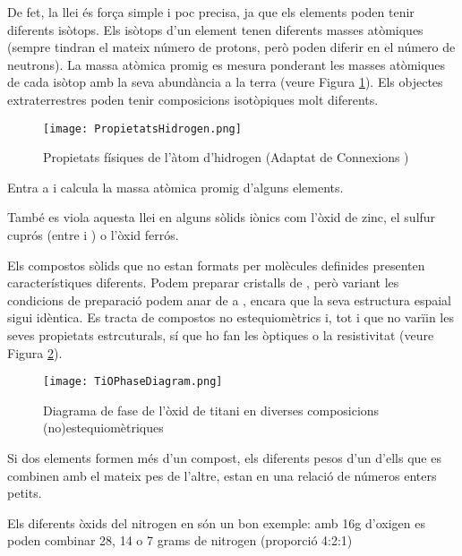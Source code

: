De fet, la llei és força simple i poc precisa, ja que els elements poden tenir diferents isòtops.
Els isòtops d'un element tenen diferents masses atòmiques (sempre tindran el mateix número de protons, però poden diferir en el número de neutrons). La massa atòmica promig es mesura ponderant les masses atòmiques de cada isòtop amb la seva abundància a la terra (veure Figura \ref{fig:PropietatsHidrogen}).
Els objectes extraterrestres poden tenir composicions isotòpiques molt diferents.
\begin{figure}[h]
\centering
\texttt{[image: PropietatsHidrogen.png]}
\caption{Propietats físiques de l'àtom d'hidrogen (Adaptat de Connexions )}
\label{fig:PropietatsHidrogen}
\end{figure}
\begin{exr}
Entra a  i calcula la massa atòmica promig d'alguns elements.
\end{exr}
També es viola aquesta llei en alguns sòlids iònics com l'òxid de zinc, el sulfur cuprós (entre  i ) o l'òxid ferrós.

Els compostos sòlids que no estan formats per molècules definides presenten característiques diferents. Podem preparar cristalls de , però variant les condicions de preparació podem anar de  a , encara que la seva estructura espaial sigui idèntica. Es tracta de compostos no estequiomètrics i, tot i que no varïin les seves propietats estrcuturals, sí que ho fan les òptiques o la resistivitat (veure Figura \ref{fig:TiOPhaseDiagram}).
\begin{figure}[h]
\centering
\texttt{[image: TiOPhaseDiagram.png]}
\caption{Diagrama de fase de l'òxid de titani en diverses composicions (no)estequiomètriques\cite{de_vries_phase_1954}}
\label{fig:TiOPhaseDiagram}
\end{figure}

\begin{mdframed}[backgroundcolor=gray!30,frametitle=Llei de les proporcions múltiples]
Si dos elements formen més d'un compost, els diferents pesos d'un d'ells que es combinen amb el mateix pes de l'altre, estan en una relació de números enters petits.
\end{mdframed}

Els diferents òxids del nitrogen en són un bon exemple: amb 16g d'oxigen es poden combinar 28, 14 o 7 grams de nitrogen (proporció 4:2:1)


